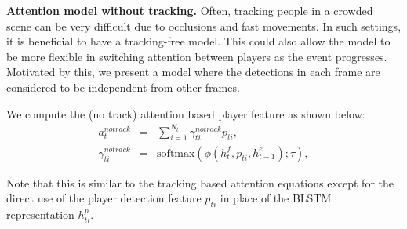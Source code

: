 
\noindent \textbf{Attention model without tracking.}
Often, tracking people in a crowded scene can be very difficult due to
occlusions and fast movements. In such settings, it is beneficial to have a
tracking-free model. This could also allow the model to be
more flexible in switching attention between players as the event progresses.
Motivated by this, we present a model where the detections in each frame are
considered to be independent from other frames. 

We  compute the (no track) attention based player feature as shown below:
\begin{eqnarray} 
\label{eq:notrack}
  a_t^{notrack} & = & \sum_{i=1}^{N_t} \gamma_{ti}^{notrack} p_{ti},
\\ \nonumber
  \gamma_{ti}^{notrack} & = & \text{softmax} \left(\phi\left(h^f_t, p_{ti}, h^e_{t-1}\right); \tau\right),
\end{eqnarray}

Note that this is similar to the tracking based attention equations except for
the direct use of the player detection feature $p_{ti}$ in place of the
BLSTM representation $h_{ti}^p$.
